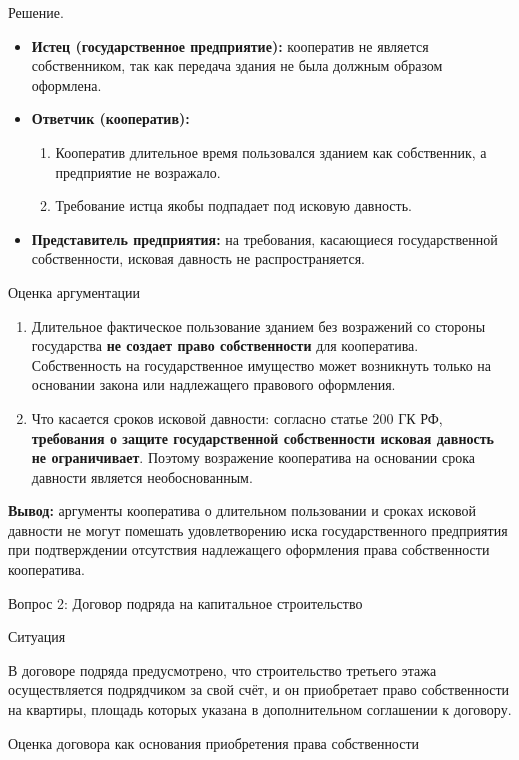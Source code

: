 \documentclass[14pt,a4paper]{extarticle}
\begin{document}
Решение.

\begin{itemize}
    \item \textbf{Истец (государственное предприятие):} кооператив не является собственником, так как передача здания не была должным образом оформлена.
    \item \textbf{Ответчик (кооператив):}
    \begin{enumerate}
        \item Кооператив длительное время пользовался зданием как собственник, а предприятие не возражало.
        \item Требование истца якобы подпадает под исковую давность.
    \end{enumerate}
    \item \textbf{Представитель предприятия:} на требования, касающиеся государственной собственности, исковая давность не распространяется.
\end{itemize}

Оценка аргументации

\begin{enumerate}
    \item Длительное фактическое пользование зданием без возражений со стороны государства \textbf{не создает право собственности} для кооператива. Собственность на государственное имущество может возникнуть только на основании закона или надлежащего правового оформления.
    \item Что касается сроков исковой давности: согласно статье 200 ГК РФ, \textbf{требования о защите государственной собственности исковая давность не ограничивает}. Поэтому возражение кооператива на основании срока давности является необоснованным.
\end{enumerate}

\textbf{Вывод:} аргументы кооператива о длительном пользовании и сроках исковой давности не могут помешать удовлетворению иска государственного предприятия при подтверждении отсутствия надлежащего оформления права собственности кооператива.

Вопрос 2: Договор подряда на капитальное строительство

Ситуация

В договоре подряда предусмотрено, что строительство третьего этажа осуществляется подрядчиком за свой счёт, и он приобретает право собственности на квартиры, площадь которых указана в дополнительном соглашении к договору.

Оценка договора как основания приобретения права собственности
\end{document}

